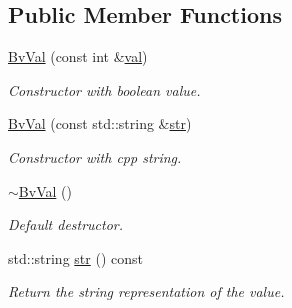 \subsection*{Public Member Functions}
\begin{DoxyCompactItemize}
\item 
\mbox{\label{classilang_1_1_bv_val_ac5af5372c4cfe21cf4c41b7df3b47436}} 
\mbox{\hyperlink{classilang_1_1_bv_val_ac5af5372c4cfe21cf4c41b7df3b47436}{Bv\+Val}} (const int \&\mbox{\hyperlink{classilang_1_1_bv_val_a1e1171385bcead2c457560938ce0fe35}{val}})
\begin{DoxyCompactList}\small\item\em Constructor with boolean value. \end{DoxyCompactList}\item 
\mbox{\label{classilang_1_1_bv_val_aa463fe197751e7ab73bff279b3414d8f}} 
\mbox{\hyperlink{classilang_1_1_bv_val_aa463fe197751e7ab73bff279b3414d8f}{Bv\+Val}} (const std\+::string \&\mbox{\hyperlink{classilang_1_1_bv_val_a0b97eede0294590cffbd0a72161487b0}{str}})
\begin{DoxyCompactList}\small\item\em Constructor with cpp string. \end{DoxyCompactList}\item 
\mbox{\label{classilang_1_1_bv_val_a2a4da086143b0a9e437d22fac4725783}} 
\mbox{\hyperlink{classilang_1_1_bv_val_a2a4da086143b0a9e437d22fac4725783}{$\sim$\+Bv\+Val}} ()
\begin{DoxyCompactList}\small\item\em Default destructor. \end{DoxyCompactList}\item 
\mbox{\label{classilang_1_1_bv_val_a0b97eede0294590cffbd0a72161487b0}} 
std\+::string \mbox{\hyperlink{classilang_1_1_bv_val_a0b97eede0294590cffbd0a72161487b0}{str}} () const
\begin{DoxyCompactList}\small\item\em Return the string representation of the value. \end{DoxyCompactList}\item 
\mbox{\label{classilang_1_1_bv_val_a1e1171385bcead2c457560938ce0fe35}} 

\end{DoxyCompactItemize}
